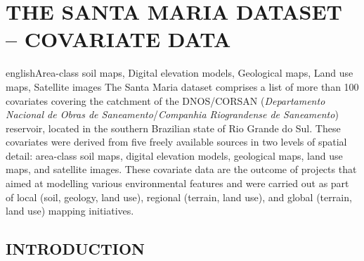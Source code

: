 \artigotrue
\chapter{THE SANTA MARIA DATASET -- COVARIATE DATA}
\label{chap:chap05}



%

\def\enkeys{Area-class soil maps, Digital elevation models, Geological maps, Land use maps, Satellite images}
  
\begin{chapterabstract}{english}{\enkeys}
The Santa Maria dataset comprises a list of more than 100 covariates covering the catchment of the DNOS/CORSAN 
(\textit{Departamento Nacional de Obras de Saneamento}/\textit{Companhia Riograndense de Saneamento}) 
reservoir, 
located in the southern Brazilian state of Rio Grande do Sul. These covariates were derived from five freely 
available sources in two levels of spatial detail: area-class soil maps, digital elevation models, geological 
maps, land use maps, 
and satellite images. These covariate data are the outcome of projects that aimed at modelling various 
environmental 
features and were carried out as part of local (soil, geology, land use), regional (terrain, land use), and 
global (terrain, 
land use) mapping initiatives.
\end{chapterabstract}

\formatchapter

\section{INTRODUCTION}
\label{sec:chap05-intro}



